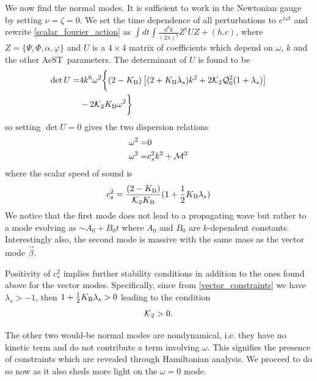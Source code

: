\documentclass[twocolumn,prd,preprintnumbers,amsmath,amssymb,nofootinbib,superscriptaddress]{revtex4-1}
\newcommand{\AeST}{AeST~}
\newcommand{\lambdas}{\lambda_s}
\newcommand{\Kcal}{{\cal K}}
\newcommand{\Mcal}{{\cal M}}
\newcommand{\Qcal}{{\cal Q}}
\newcommand{\KB}{\ensuremath{K_{{\rm B}}}}
\begin{document}
We now find the normal modes. It is sufficient to work in the Newtonian gauge by setting $\nu = \zeta = 0$.
We set the time dependence of all perturbations to $e^{i\omega t}$ 
 and rewrite \eqref{scalar_fourier_action} as $ \int dt \int \frac{d^{3}k }{(2\pi)^3} Z^\dagger U  Z + (h.c) $, where 
$Z = \{ \Psi, \Phi, \alpha,\varphi\}$ and $U$ is a $4\times 4$ matrix of coefficients which depend on $\omega$, $k$ and the other \AeST parameters.
The determinant of $U$ is found to be
\begin{align}
\det U =&  4k^6 \omega^2 \bigg\{  (2-\KB) \left[ (2 + \KB \lambdas) k^2 + 2 \Kcal_2  \Qcal_0^2 (1+\lambdas) \right] 
\nonumber 
\\
& - 2 \Kcal_2 \KB \omega^2 \bigg\}
\end{align}
so setting $\det U=0$ gives the two  dispersion relations 
\begin{align}
 \omega^2 =& 0
\\
 \omega^2 =& c_s^2 k^2  + \Mcal^2
\label{eq_dispersion}
\end{align}
where the scalar speed of sound is
\begin{equation}
c_s^2 = \frac{(2-\KB)}{\Kcal_2 \KB}  (1 + \frac{1}{2} \KB \lambdas)  
\label{speed_of_sound}
\end{equation}
We notice that the first mode does not lead to a propagating wave but rather to a mode evolving as $\sim A_0 + B_0 t$ where $A_0$ and $B_0$ are $k$-dependent constants.
Interestingly also, the second mode is massive with the same mass as the vector mode $\vec{\beta}$.

Positivity of $c_s^2$ implies further stability conditions in addition to the ones found above for the vector modes. Specifically, 
since from \eqref{vector_constraints} we have $\lambdas>-1$, then $1 + \frac{1}{2} \KB \lambdas>0$ leading to the condition
\begin{align}
\Kcal_2 > 0.
\label{scalar_constraints}
\end{align}

The other two would-be normal modes are nondynamical, i.e. they have no kinetic term and do not contribute a term involving $\omega$.  This signifies the presence of constraints
which are revealed through Hamiltonian analysis. We proceed to do so now as it also sheds more light on the $\omega=0$ mode.
\end{document}
